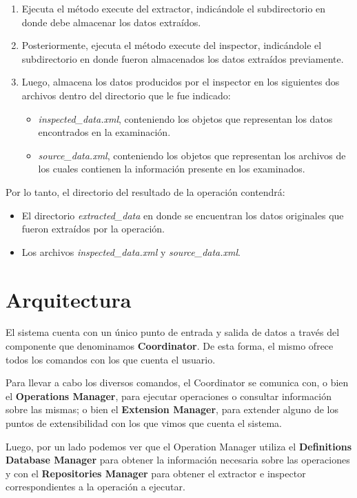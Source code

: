 \begin{enumerate}
\item Ejecuta el método execute del extractor, indicándole el subdirectorio en donde debe almacenar los datos extraídos.
\item Posteriormente, ejecuta el método execute del inspector, indicándole el subdirectorio en donde fueron almacenados los datos extraídos previamente.
\item Luego, almacena los datos producidos por el inspector en los siguientes dos archivos dentro del directorio que le fue indicado:
    \begin{itemize}
    \item \emph{inspected\_data.xml}, conteniendo los objetos que representan los datos encontrados en la examinación.
    \item \emph{source\_data.xml}, conteniendo los objetos que representan los archivos de los cuales contienen la información presente en los examinados.
    \end{itemize}
\end{enumerate}

Por lo tanto, el directorio del resultado de la operación contendrá:
\begin{itemize}
\item El directorio \emph{extracted\_data} en donde se encuentran los datos originales que fueron extraídos por la operación.
\item Los archivos \emph{inspected\_data.xml} y \emph{source\_data.xml}.
\end{itemize}

\section{Arquitectura} \label{arquitectura}
El sistema cuenta con un único punto de entrada y salida de datos a través del componente que denominamos \textbf{Coordinator}. De esta forma, el mismo ofrece todos los comandos con los que cuenta el usuario.

Para llevar a cabo los diversos comandos, el Coordinator se comunica con, o bien el \textbf{Operations Manager}, para ejecutar operaciones o consultar información sobre las mismas; o bien el \textbf{Extension Manager}, para extender alguno de los puntos de extensibilidad con los que vimos que cuenta el sistema.

Luego, por un lado podemos ver que el Operation Manager utiliza el \textbf{Definitions Database Manager} para obtener la información necesaria sobre las operaciones y con el \textbf{Repositories Manager} para obtener el extractor e inspector correspondientes a la operación a ejecutar.

